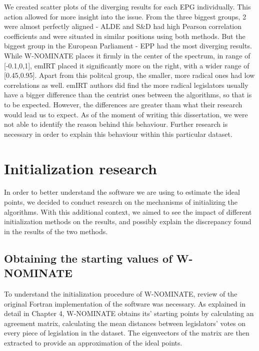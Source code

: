 \documentclass[a4paper,12pt]{report}
\begin{document}
                We created scatter plots of the diverging results for each EPG individually.
                This action allowed for more
                insight into the issue.
                From the three biggest groups, 2 were almost perfectly aligned - ALDE and S\&D had high
                Pearson correlation coefficients and were situated in similar positions using both methods. But the
                biggest
                group in the European Parliament - EPP had the most diverging results. While W-NOMINATE places it firmly
                in the
                center of the spectrum, in range of [-0.1,0,1], emIRT placed it significantly more on the right, with a
                wider range
                of [0.45,0.95]. Apart from this politcal group, the smaller, more radical ones had low correlations as
                well.
                emIRT authors did find the more radical legislators usually have a bigger difference than the centrist
                ones
                between the algorithms, so that is to be expected. However, the differences are greater tham what their
                research
                would lead us to expect.
                As of the moment of writing this dissertation, we were not able to identify the reason behind
                this behaviour.
                Further research is necessary in order to explain this behaviour within this particular dataset.


        \section{Initialization research}

            In order to better understand the software we are using to estimate the ideal points, we decided to conduct
            research on the mechanisms of initializing the algorithms.
            With this additional context, we aimed to see the
            impact of different initialization methods on the results, and possibly explain the discrepancy found in the
            results of the two methods.

            \subsection{Obtaining the starting values of W-NOMINATE}
                \label{subsec:obtaining-the-starting-values-of-w-nominate}
                To understand the initialization procedure of W-NOMINATE, review of the original Fortran implementation
                of the
                software was necessary.
                As explained in detail in Chapter 4, W-NOMINATE obtains its' starting points by
                calculating an agreement matrix, calculating the mean distances
                between legislators' votes on every piece of legislation in the dataset. The eigenvectors of the matrix
                are then
                extracted to provide an approximation of the ideal points.
\end{document}
